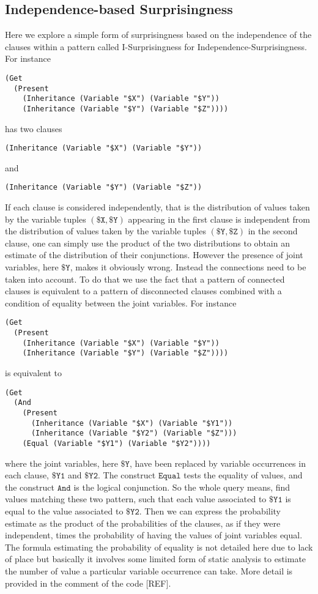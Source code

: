 \documentclass[runningheads]{llncs}
\begin{document}
\subsection{Independence-based Surprisingness}
Here we explore a simple form of surprisingness based on the
independence of the clauses within a pattern called I-Surprisingness
for Independence-Surprisingness. For instance
\begin{verbatim}
(Get
  (Present
    (Inheritance (Variable "$X") (Variable "$Y"))
    (Inheritance (Variable "$Y") (Variable "$Z"))))
\end{verbatim}
has two clauses
\begin{verbatim}
(Inheritance (Variable "$X") (Variable "$Y"))
\end{verbatim}
and
\begin{verbatim}
(Inheritance (Variable "$Y") (Variable "$Z"))
\end{verbatim}
If each clause is considered independently, that is the distribution
of values taken by the variable tuples $(\texttt{\$X}, \texttt{\$Y})$
appearing in the first clause is independent from the distribution of
values taken by the variable tuples $(\texttt{\$Y}, \texttt{\$Z})$ in
the second clause, one can simply use the product of the two
distributions to obtain an estimate of the distribution of their
conjunctions. However the presence of joint variables, here
$\texttt{\$Y}$, makes it obviously wrong. Instead the connections need
to be taken into account. To do that we use the fact that a pattern of
connected clauses is equivalent to a pattern of disconnected clauses
combined with a condition of equality between the joint variables. For
instance
\begin{verbatim}
(Get
  (Present
    (Inheritance (Variable "$X") (Variable "$Y"))
    (Inheritance (Variable "$Y") (Variable "$Z"))))
\end{verbatim}
is equivalent to
\begin{verbatim}
(Get
  (And
    (Present
      (Inheritance (Variable "$X") (Variable "$Y1"))
      (Inheritance (Variable "$Y2") (Variable "$Z")))
    (Equal (Variable "$Y1") (Variable "$Y2"))))
\end{verbatim}
where the joint variables, here $\texttt{\$Y}$, have been replaced by
variable occurrences in each clause, $\texttt{\$Y1}$ and
$\texttt{\$Y2}$. The construct $\texttt{Equal}$ tests the equality of
values, and the construct $\texttt{And}$ is the logical
conjunction. So the whole query means, find values matching these two
pattern, such that each value associated to $\texttt{\$Y1}$ is equal
to the value associated to $\texttt{\$Y2}$. Then we can express the
probability estimate as the product of the probabilities of the
clauses, as if they were independent, times the probability of having
the values of joint variables equal. The formula estimating the
probability of equality is not detailed here due to lack of place but
basically it involves some limited form of static analysis to estimate
the number of value a particular variable occurrence can take. More
detail is provided in the comment of the code [REF].
\end{document}
